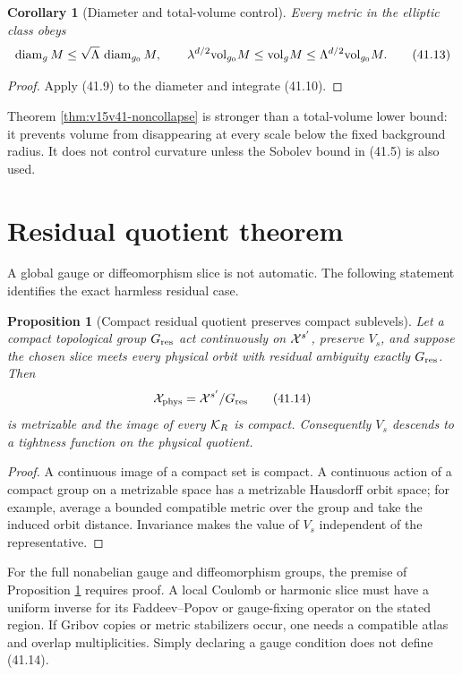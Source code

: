 \documentclass[11pt]{article}
\newtheorem{proposition}[theorem]{Proposition}
\newtheorem{corollary}[theorem]{Corollary}
\theoremstyle{remark}
\begin{document}
\begin{corollary}[Diameter and total-volume control]
\label{cor:v15v41-diameter-volume}
Every metric in the elliptic class obeys
\[
 \operatorname{diam}_gM
 \leq\sqrt\Lambda\,\operatorname{diam}_{g_0}M,\qquad
 \lambda^{d/2}{\rm vol}_{g_0}M
 \leq{\rm vol}_gM
 \leq\Lambda^{d/2}{\rm vol}_{g_0}M.                     \tag{41.13}
\]
\end{corollary}

\begin{proof}
Apply (41.9) to the diameter and integrate (41.10).
\end{proof}

Theorem \ref{thm:v15v41-noncollapse} is stronger than a total-volume
lower bound: it prevents volume from disappearing at every scale
below the fixed background radius.  It does not control curvature
unless the Sobolev bound in (41.5) is also used.

\section{Residual quotient theorem}

A global gauge or diffeomorphism slice is not automatic.  The
following statement identifies the exact harmless residual case.

\begin{proposition}[Compact residual quotient preserves compact sublevels]
\label{prop:v15v41-compact-quotient}
Let a compact topological group \(G_{\rm res}\) act continuously on
\({\cal X}^{s'}\), preserve \(V_s\), and suppose the chosen slice
meets every physical orbit with residual ambiguity exactly
\(G_{\rm res}\).  Then
\[
 {\cal X}_{\rm phys}={\cal X}^{s'}/G_{\rm res}           \tag{41.14}
\]
is metrizable and the image of every \({\cal K}_R\) is compact.
Consequently \(V_s\) descends to a tightness function on the
physical quotient.
\end{proposition}

\begin{proof}
A continuous image of a compact set is compact.  A continuous
action of a compact group on a metrizable space has a metrizable
Hausdorff orbit space; for example, average a bounded compatible
metric over the group and take the induced orbit distance.
Invariance makes the value of \(V_s\) independent of the
representative.
\end{proof}

For the full nonabelian gauge and diffeomorphism groups, the premise
of Proposition \ref{prop:v15v41-compact-quotient} requires proof.
A local Coulomb or harmonic slice must have a uniform inverse for
its Faddeev--Popov or gauge-fixing operator on the stated region.
If Gribov copies or metric stabilizers occur, one needs a compatible
atlas and overlap multiplicities.  Simply declaring a gauge
condition does not define (41.14).
\end{document}
